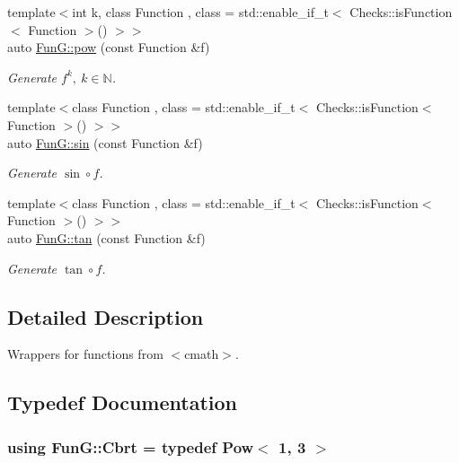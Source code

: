 \begin{DoxyCompactItemize}
{\footnotesize template$<$int k, class Function , class  = std\+::enable\+\_\+if\+\_\+t$<$ Checks\+::is\+Function$<$ Function $>$() $>$$>$ }\\auto \hyperlink{group__CMathGroup_gab52ffe2efd379aad7ea322de46103465}{Fun\+G\+::pow} (const Function \&f)
\begin{DoxyCompactList}\small\item\em Generate $ f^k,\ k\in\mathbb{N}$. \end{DoxyCompactList}\item 
{\footnotesize template$<$class Function , class  = std\+::enable\+\_\+if\+\_\+t$<$ Checks\+::is\+Function$<$ Function $>$() $>$$>$ }\\auto \hyperlink{group__CMathGroup_ga663fdbe7a8977cba529c7c33981b7738}{Fun\+G\+::sin} (const Function \&f)
\begin{DoxyCompactList}\small\item\em Generate $ \sin\circ f $. \end{DoxyCompactList}\item 
{\footnotesize template$<$class Function , class  = std\+::enable\+\_\+if\+\_\+t$<$ Checks\+::is\+Function$<$ Function $>$() $>$$>$ }\\auto \hyperlink{group__CMathGroup_gae03f57bd4efb4449ad1dc60cb74c742d}{Fun\+G\+::tan} (const Function \&f)
\begin{DoxyCompactList}\small\item\em Generate $ \tan\circ f $. \end{DoxyCompactList}\end{DoxyCompactItemize}


\subsection{Detailed Description}
Wrappers for functions from $<$cmath$>$. 



\subsection{Typedef Documentation}
\subsubsection[{\texorpdfstring{Cbrt}{Cbrt}}]{\setlength{\rightskip}{0pt plus 5cm}using {\bf Fun\+G\+::\+Cbrt} = typedef Pow$<$ 1, 3 $>$}\hypertarget{group__CMathGroup_gaff369d639f7a316b3f22982e806cb45f}{}\label{group__CMathGroup_gaff369d639f7a316b3f22982e806cb45f}


